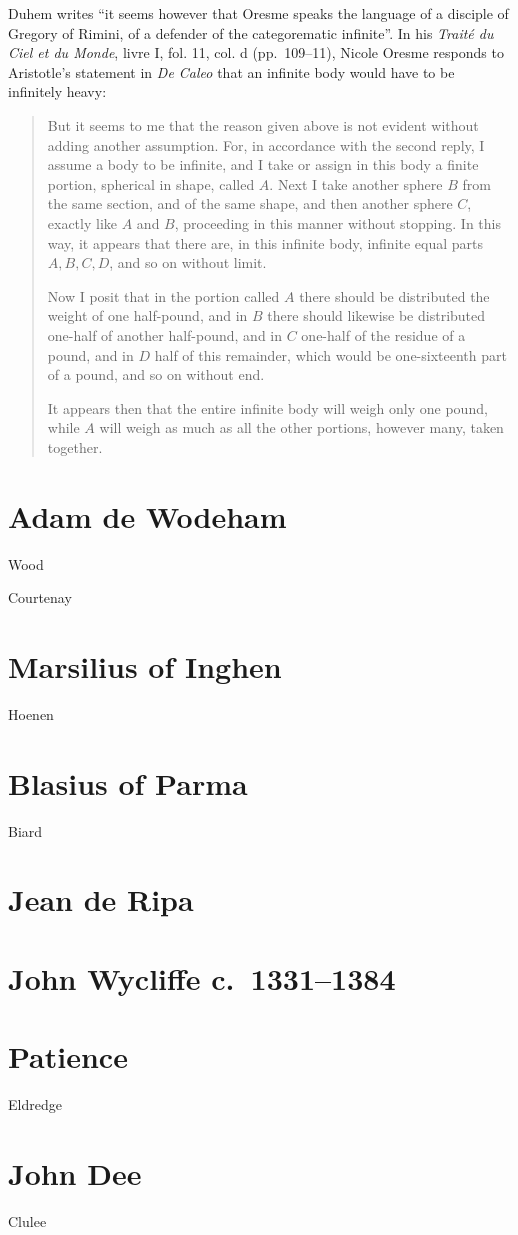 \documentclass{amsart}
\theoremstyle{definition}
\begin{document}
Duhem writes \cite[p.~126]{ariew} ``it seems however that Oresme speaks the language of a disciple of Gregory of Rimini, of a defender of the categorematic infinite''. 
In his {\em Trait\'e du Ciel et du Monde},
livre I, fol. 11, col. d (pp.~109--11),
 Nicole Oresme responds to Aristotle's statement in {\em De Caleo} that an infinite body would have to be infinitely heavy: \cite[p.~127]{ariew}
\begin{quote}
But it seems to me that the reason given above is not evident without adding another assumption. For, in accordance with the second reply, I assume a body to be infinite,
and I take or assign in this body a finite portion, spherical in shape, called $A$. Next I take another sphere $B$ from the same section, and of the same shape,
and then another sphere $C$, exactly like $A$ and $B$, proceeding in this manner without stopping. In this way, it appears that there are, in this infinite body,
infinite equal parts $A,B,C,D$, and so on without limit.

Now I posit that in the portion called $A$ there should be distributed the weight of one half-pound, and in $B$ there should likewise be distributed one-half
of another half-pound, and in $C$ one-half of the residue of a pound, and in $D$ half of this remainder, which would be one-sixteenth part of a pound, and so on without
end.

It appears then that the entire infinite body will weigh only one pound, while $A$ will weigh as much as all the other portions, however many, taken
together.
\end{quote}


\section{Adam de Wodeham}
Wood \cite{wodeham}

Courtenay \cite{courtenay1978}

\section{Marsilius of Inghen}
Hoenen \cite{hoenen}

\section{Blasius of Parma}
Biard \cite{blasius}

\section{Jean de Ripa}

\section{John Wycliffe c.~1331--1384}

\section{Patience}
Eldredge \cite{eldredge}

\section{John Dee}
Clulee \cite{johndee}

\nocite{*}



\end{document}
